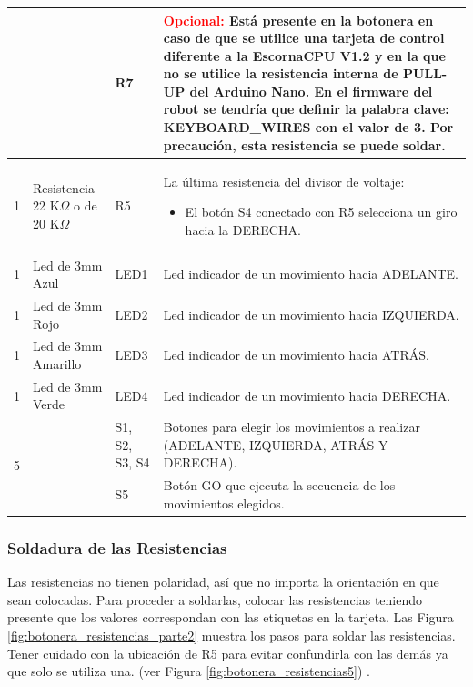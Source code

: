 \documentclass{article}
\begin{document}
\begin{longtable}{|c|>{\raggedright}m{}|>{\centering}m{}|m{}|}
    &  & R7 & \textcolor{red}{Opcional:} Está presente en la botonera en caso de que se utilice una tarjeta de control diferente a la EscornaCPU V1.2 y en la que no se utilice la resistencia interna de PULL-UP del Arduino Nano. En el firmware del robot se tendría que definir la palabra clave: KEYBOARD\_WIRES con el valor de 3. Por precaución, esta resistencia se puede soldar.
    \\ \hline
    1 & Resistencia 22 K$\Omega$ o de 20 K$\Omega$ & R5 & La última resistencia  del divisor de voltaje: 
    \begin{itemize}
        \item El botón S4 conectado con R5 selecciona un giro hacia la DERECHA.
    \end{itemize}
    \\ \hline
    1 & Led de 3mm Azul & LED1 & Led indicador de un movimiento hacia ADELANTE.
    \\ \hline
    1 & Led de 3mm Rojo & LED2 & Led indicador de un movimiento hacia IZQUIERDA.
    \\ \hline
    1 & Led de 3mm Amarillo & LED3 & Led indicador de un movimiento hacia ATRÁS.
    \\ \hline
    1 & Led de 3mm Verde & LED4 & Led indicador de un movimiento hacia DERECHA. 
    \\ \hline
    \multirow{3}{*}{5} & \multirow{3}{*}{Pulsadores de 12mm} & S1, S2, S3, S4 & Botones para elegir los movimientos a realizar (ADELANTE, IZQUIERDA, ATRÁS Y DERECHA).
    \\ \cline{3-4}
    & & S5 & Botón GO que ejecuta la secuencia de los movimientos elegidos.
    \\ \hline 
\end{longtable}

\subsubsection{Soldadura de las Resistencias}
Las resistencias no tienen polaridad, así que no importa la orientación en que sean colocadas. Para proceder a soldarlas, colocar las resistencias teniendo presente que los valores correspondan con las etiquetas en la tarjeta. Las Figura \ref{fig:botonera_resistencias_parte2} muestra los pasos para soldar las resistencias. Tener cuidado con la ubicación de R5 para evitar confundirla con las demás ya que solo se utiliza una. (ver Figura \ref{fig:botonera_resistencias5}) .
\end{document}
